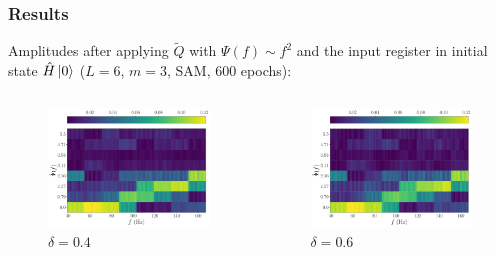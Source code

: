 \documentclass{beamer}
\begin{document}
\begin{frame}
\frametitle{Results}
Amplitudes after applying $\tilde{Q}$ with $\Psi(f) \sim f^2$ and the input register in initial state $\hat{H} \ket{0}$ ($L=6$, $m=3$, SAM, 600 epochs):
\begin{columns}
\begin{column}{0.5\textwidth}
\begin{figure}
\centering
\includegraphics[width=\textwidth]{im/Q_amp_quadratic_0.4_H.pdf}
\caption{$\delta =0.4$}
\end{figure}
\end{column}
\begin{column}{0.5\textwidth}
\begin{figure}
\centering
\includegraphics[width=\textwidth]{im/Q_amp_quadratic_0.6_H.pdf}
\caption{$\delta =0.6$}
\end{figure} 
\end{column}
\end{columns}
\end{frame}
\end{document}

